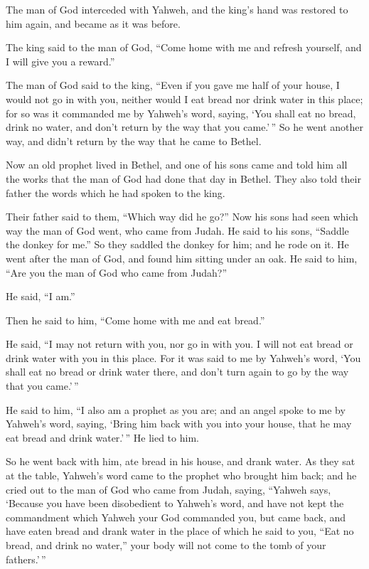 The man of God interceded with Yahweh, and the king's hand was restored
to him again, and became as it was before.

 The king said to the man of God, ``Come home with me and
refresh yourself, and I will give you a reward.''

 The man of God said to the king, ``Even if you gave me half
of your house, I would not go in with you, neither would I eat bread nor
drink water in this place;  for so was it commanded me by
Yahweh's word, saying, `You shall eat no bread, drink no water, and
don't return by the way that you came.'\,''  So he went
another way, and didn't return by the way that he came to Bethel.

 Now an old prophet lived in Bethel, and one of his sons
came and told him all the works that the man of God had done that day in
Bethel. They also told their father the words which he had spoken to the
king.

 Their father said to them, ``Which way did he go?'' Now
his sons had seen which way the man of God went, who came from Judah.
 He said to his sons, ``Saddle the donkey for me.'' So they
saddled the donkey for him; and he rode on it.  He went
after the man of God, and found him sitting under an oak. He said to
him, ``Are you the man of God who came from Judah?''

He said, ``I am.''

 Then he said to him, ``Come home with me and eat bread.''

 He said, ``I may not return with you, nor go in with you.
I will not eat bread or drink water with you in this place.
 For it was said to me by Yahweh's word, `You shall eat no
bread or drink water there, and don't turn again to go by the way that
you came.'\,''

 He said to him, ``I also am a prophet as you are; and an
angel spoke to me by Yahweh's word, saying, `Bring him back with you
into your house, that he may eat bread and drink water.'\,'' He lied to
him.

 So he went back with him, ate bread in his house, and
drank water.  As they sat at the table, Yahweh's word came
to the prophet who brought him back;  and he cried out to
the man of God who came from Judah, saying, ``Yahweh says, `Because you
have been disobedient to Yahweh's word, and have not kept the
commandment which Yahweh your God commanded you,  but came
back, and have eaten bread and drank water in the place of which he said
to you, ``Eat no bread, and drink no water,'' your body will not come to
the tomb of your fathers.'\,''

